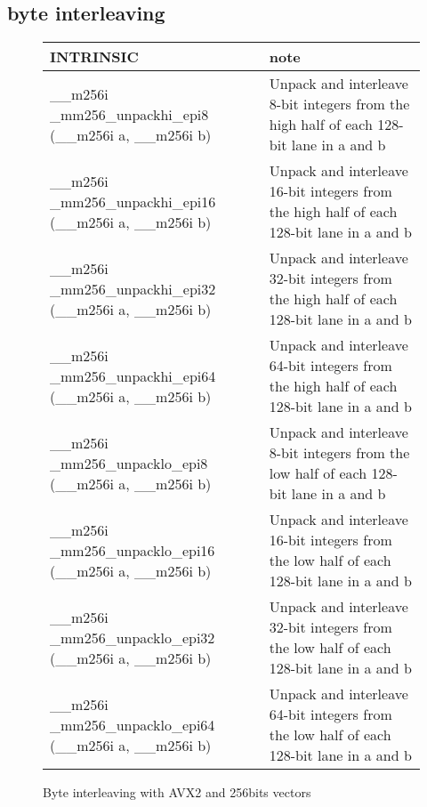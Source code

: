 \documentclass{article}
\begin{document}
\subsection{byte interleaving}
\vspace{1cm}
\begin{figure}[h!]
\noindent
\noindent\begin{tabular}{|l|l|}
  \hline
  INTRINSIC & note \\
  \hline
  \_\_m256i \_mm256\_unpackhi\_epi8 (\_\_m256i a, \_\_m256i b) & Unpack and interleave 8-bit integers from the high half of each 128-bit lane in a and b\\
\hline
\_\_m256i \_mm256\_unpackhi\_epi16 (\_\_m256i a, \_\_m256i b) & Unpack and interleave 16-bit integers from the high half of each 128-bit lane in a and b\\
\hline
\_\_m256i \_mm256\_unpackhi\_epi32 (\_\_m256i a, \_\_m256i b) & Unpack and interleave 32-bit integers from the high half of each 128-bit lane in a and b\\
\hline
\_\_m256i \_mm256\_unpackhi\_epi64 (\_\_m256i a, \_\_m256i b) & Unpack and interleave 64-bit integers from the high half of each 128-bit lane in a and b\\
\hline
  \_\_m256i \_mm256\_unpacklo\_epi8 (\_\_m256i a, \_\_m256i b) & Unpack and interleave 8-bit integers from the low half of each 128-bit lane in a and b\\
\hline
\_\_m256i \_mm256\_unpacklo\_epi16 (\_\_m256i a, \_\_m256i b) & Unpack and interleave 16-bit integers from the low half of each 128-bit lane in a and b\\
\hline
\_\_m256i \_mm256\_unpacklo\_epi32 (\_\_m256i a, \_\_m256i b) & Unpack and interleave 32-bit integers from the low half of each 128-bit lane in a and b\\
\hline
\_\_m256i \_mm256\_unpacklo\_epi64 (\_\_m256i a, \_\_m256i b) & Unpack and interleave 64-bit integers from the low half of each 128-bit lane in a and b\\
\hline
\end{tabular}
    \caption{Byte interleaving with AVX2 and 256bits vectors}
    \label{fig:Byte interleaving with AVX2 and 256bits vectors}
\end{figure}
\end{document}
